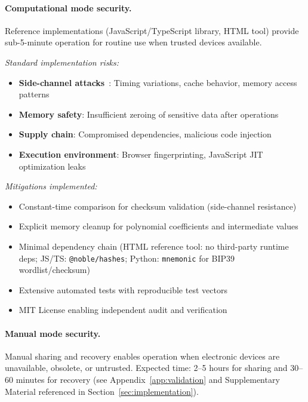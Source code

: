 \documentclass[11pt]{article}
\begin{document}
\paragraph{Computational mode security.} Reference implementations (JavaScript/TypeScript library, HTML tool) provide sub-5-minute operation for routine use when trusted devices available.

\textit{Standard implementation risks:}
\begin{itemize}[noitemsep]
    \item \textbf{Side-channel attacks}~\cite{kocher1996}: Timing variations, cache behavior, memory access patterns
    \item \textbf{Memory safety}: Insufficient zeroing of sensitive data after operations
    \item \textbf{Supply chain}: Compromised dependencies, malicious code injection
    \item \textbf{Execution environment}: Browser fingerprinting, JavaScript JIT optimization leaks
\end{itemize}

\textit{Mitigations implemented:}
\begin{itemize}[noitemsep]
    \item Constant-time comparison for checksum validation (side-channel resistance)
    \item Explicit memory cleanup for polynomial coefficients and intermediate values
    \item Minimal dependency chain (HTML reference tool: no third-party runtime deps; JS/TS: \texttt{@noble/hashes}; Python: \texttt{mnemonic} for BIP39 wordlist/checksum)
    \item Extensive automated tests with reproducible test vectors
    \item MIT License enabling independent audit and verification
\end{itemize}

\paragraph{Manual mode security.} Manual sharing and recovery enables operation when electronic devices are unavailable, obsolete, or untrusted. Expected time: 2--5 hours for sharing and 30--60 minutes for recovery (see Appendix~\ref{app:validation} and Supplementary Material referenced in Section~\ref{sec:implementation}).
\end{document}
